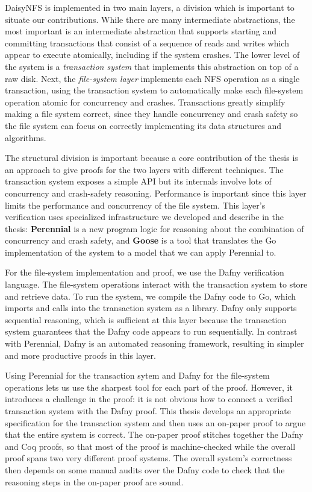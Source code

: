 
DaisyNFS is implemented in two main layers, a division which is important to
situate our contributions. While there are many intermediate abstractions, the
most important is an intermediate abstraction that supports starting and
committing transactions that consist of a sequence of reads and writes which
appear to execute atomically, including if the system crashes. The lower level
of the system is a \emph{transaction system} that implements this abstraction on
top of a raw disk. Next, the \emph{file-system layer} implements each NFS
operation as a single transaction, using the transaction system to automatically
make each file-system operation atomic for
concurrency and crashes. Transactions greatly simplify making a file
system correct, since they handle concurrency and crash safety so the
file system can focus on correctly implementing its data structures and
algorithms.

The structural division is important because a core contribution of the thesis
is an approach to give proofs for the two layers with different techniques.
The transaction
system exposes a simple API but its internals involve lots of
concurrency and crash-safety reasoning. Performance is important since
this layer limits the performance and concurrency of the file system.
This layer's verification uses specialized infrastructure we developed
and describe in the thesis: \textbf{Perennial} is a new program logic
for reasoning about the combination of concurrency and crash safety, and
\textbf{Goose} is a tool that translates the Go implementation of the
system to a model that we can apply Perennial to.

For the file-system implementation and proof, we use the Dafny
verification language. The file-system operations interact with the
transaction system to store and retrieve data. To run the system, we
compile the Dafny code to Go, which imports and calls into the
transaction system as a library. Dafny only supports sequential
reasoning, which is sufficient at this layer because the transaction
system guarantees that the Dafny code appears to run sequentially. In contrast
with Perennial, Dafny is an automated reasoning framework, resulting in simpler
and more productive proofs in this layer.

Using Perennial for the transaction sytem and Dafny for the file-system
operations lets us use the sharpest tool for each part of the proof. However, it
introduces a challenge in the proof: it is not obvious how to connect a verified
transaction system with the Dafny proof. This thesis develops an appropriate
specification for the transaction system and then uses an on-paper proof to
argue that the entire system is correct. The on-paper proof stitches together
the Dafny and Coq proofs, so that most of the proof is machine-checked while the
overall proof spans two very different proof systems. The overall system's
correctness then depends on some manual audits over the Dafny code to check that
the reasoning steps in the on-paper proof are sound.

